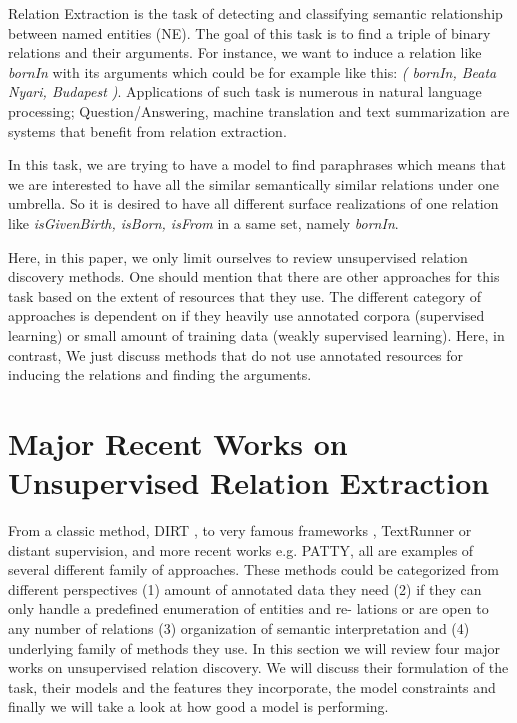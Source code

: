 \documentclass[12pt]{report}
\begin{document}
Relation Extraction is the task of detecting and classifying semantic relationship 
between named entities (NE). The goal of this task is to find a triple
of binary relations and their arguments. For instance, we want to induce a
relation like \emph{bornIn} with its arguments which could be for example like this:\emph{ (
bornIn, Beata Nyari, Budapest )}. Applications of such task is numerous
in natural language processing; Question/Answering, machine translation and
text summarization are systems that benefit from relation extraction.

In this task, we are trying to have a model to find paraphrases which means
that we are interested to have all the similar semantically similar relations under
one umbrella. So it is desired to have all different surface realizations of one
relation like \emph{isGivenBirth, isBorn, isFrom} in a same set, namely \emph{bornIn}.

Here, in this paper, we only limit ourselves to review unsupervised relation discovery methods. 
One should mention that there are other approaches for this task based on the extent of resources that they use.
 The different category of approaches is dependent on if they heavily use annotated corpora (supervised learning) or 
 small amount of training data (weakly supervised learning). Here, in contrast, 
 We just discuss methods that do not use annotated resources for inducing the relations and finding the arguments. 



\chapter{Major Recent Works on Unsupervised Relation Extraction}
\label{ch:related}

From a classic method, DIRT \cite{Lin2001}, to very famous frameworks ,
TextRunner\cite{Bankoa} or distant supervision\cite{Mintz2009}, and more recent works e.g. PATTY\cite{Nakashole2012a},
all are examples of several different family of approaches. These methods could
be categorized from different perspectives (1) amount of annotated data they
need (2) if they can only handle a predefined enumeration of entities and re-
lations or are open to any number of relations (3) organization of semantic
interpretation and (4) underlying family of methods they use.
In this section we will review four major works on unsupervised relation discovery.
 We will discuss their formulation of the task, their models
 and the features they incorporate, the model constraints and finally we will take a look at how good a model is performing.
\end{document}
